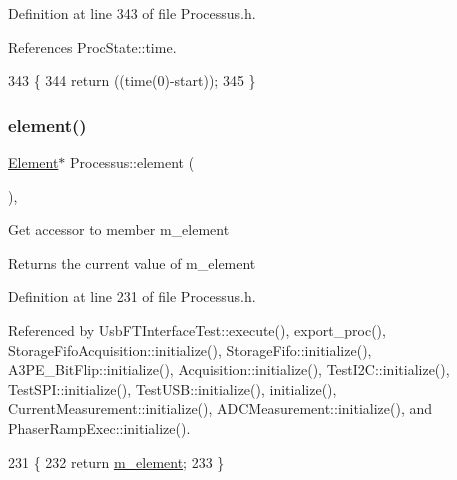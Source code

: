 Definition at line 343 of file Processus.\+h.



References Proc\+State\+::time.


\begin{DoxyCode}
343                                    \{
344     \textcolor{keywordflow}{return} ((time(0)-start));
345   \}
\end{DoxyCode}
\mbox{\label{classProcessus_a6fe155527431a7190b7d44d600b9608d}} 
\subsubsection{\texorpdfstring{element()}{element()}}
{\footnotesize\ttfamily \hyperlink{classElement}{Element}$\ast$ Processus\+::element (\begin{DoxyParamCaption}{ }\end{DoxyParamCaption})\hspace{0.3cm}{\ttfamily [inline]}, {\ttfamily [inherited]}}

Get accessor to member m\+\_\+element \begin{DoxyReturn}{Returns}
the current value of m\+\_\+element 
\end{DoxyReturn}


Definition at line 231 of file Processus.\+h.



Referenced by Usb\+F\+T\+Interface\+Test\+::execute(), export\+\_\+proc(), Storage\+Fifo\+Acquisition\+::initialize(), Storage\+Fifo\+::initialize(), A3\+P\+E\+\_\+\+Bit\+Flip\+::initialize(), Acquisition\+::initialize(), Test\+I2\+C\+::initialize(), Test\+S\+P\+I\+::initialize(), Test\+U\+S\+B\+::initialize(), initialize(), Current\+Measurement\+::initialize(), A\+D\+C\+Measurement\+::initialize(), and Phaser\+Ramp\+Exec\+::initialize().


\begin{DoxyCode}
231                       \{
232     \textcolor{keywordflow}{return} \hyperlink{classProcessus_aa9d24d53c3e52f36786cabb5d8e296e7}{m\_element};
233   \}
\end{DoxyCode}
\mbox{\label{classProcessus_a5e4da662989d356b89d490b89c7afbfd}} 
